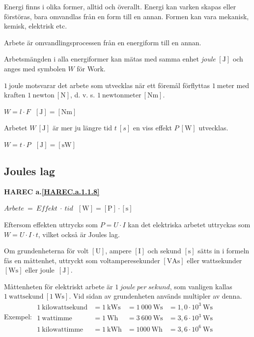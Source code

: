 Energi finns i olika former, alltid och överallt.
Energi kan varken skapas eller förstöras, bara omvandlas från en form till en
annan.
Formen kan vara mekanisk, kemisk, elektrisk etc.

Arbete är omvandlingsprocessen från en energiform till en annan.

Arbetsmängden i alla energiformer kan mätas med samma enhet \emph{joule}
\(\mathrm{[J]}\) \cite{SIbrochure8} och anges med symbolen \(W\) för Work.

\(1\ \mathrm{joule}\) motsvarar det arbete som utvecklas när ett föremål
förflyttas \(1\ \mathrm{meter}\) med kraften \(1\ \mathrm{newton\ [N]}\),
d. v. s. \(1\ \mathrm{newtonmeter\ [Nm]}\).

\(W = l \cdot F \ \ \ \mathrm{[J] = [Nm]}\)

Arbetet \(W\ \mathrm{[J]}\) är mer ju längre tid \(t\ [s]\) en viss effekt
\(P\ \mathrm{[W]}\) utvecklas.

\(W = t \cdot P \ \ \ \mathrm{[J] = [sW]}\)
  
\subsection{Joules lag}
\textbf{HAREC a.\ref{HAREC.a.1.1.8}\label{myHAREC.a.1.1.8}}

\(Arbete\ =\ Effekt\ \cdot\ tid\ \ \ \mathrm{[W]} = \mathrm{[P]} \cdot \mathrm{[s]}\)

Eftersom effekten uttrycks som \(P = U \cdot I\) kan det elektriska arbetet
uttryckas som \(W = U \cdot I \cdot t\), vilket också är Joules lag.

Om grundenheterna för volt \(\mathrm{[U]}\), ampere \(\mathrm{[I]}\) och
sekund \(\mathrm{[s]}\) sätts in i formeln fås en måttenhet, uttryckt som
voltamperesekunder \(\mathrm{[VAs]}\) eller wattsekunder \(\mathrm{[Ws]}\)
eller joule\ \(\mathrm{[J]}\).

Måttenheten för elektriskt arbete är \(1\ joule\ per\ sekund\), som vanligen
kallas \(1\ \mathrm{wattsekund}\ \mathrm{[1\ Ws]}\).
Vid sidan av grundenheten används multipler av denna.
Exempel:
\(
\begin{array}{llll}
1\ \mathrm{kilowattsekund} & = 1\ \mathrm{kWs} & = 1\ 000\ \mathrm{Ws} & = 1,0 \cdot 10^3\ \mathrm{Ws}\\
1\ \mathrm{wattimme} & = 1\ \mathrm{Wh} & = 3\ 600\ \mathrm{Ws} & = 3,6 \cdot 10^3\ \mathrm{Ws} \\
1\ \mathrm{kilowattimme} & = 1\ \mathrm{kWh} & = 1 000\ \mathrm{Wh} & = 3,6 \cdot 10^6\ \mathrm{Ws}
\end{array}
\)

